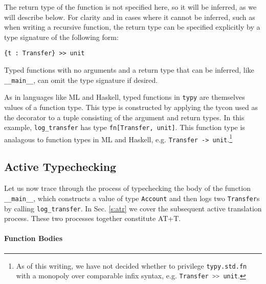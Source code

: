 \documentclass[preprint,10pt]{sigplanconf}
\newcommand{\lip}[1]{\lstinline[language=Python,basicstyle=\ttfamily\small,deletendkeywords={tuple,buffer,map}]{#1}}
\begin{document}
The return type of the function is not specified here, so it will be inferred, as we will describe below. For clarity and in cases where it cannot be inferred, such as when writing a recursive function, the return type can be specified explicitly by a type signature of the following form:
 \begin{lstlisting}[numbers=none]
 {t : Transfer} >> unit
 \end{lstlisting}
Typed functions with no arguments and a return type that can be inferred, like \lip{__main__}, can omit the type signature if desired.

As in languages like ML and Haskell, typed functions in \verb|typy| are themselves values of a function type. This type is constructed by applying the tycon used as the decorator to a tuple consisting of the argument and return types. In this example, \lip{log_transfer} has type \lip{fn[Transfer, unit]}. This function type is analagous to function types in ML and Haskell, e.g. \lstinline{Transfer -> unit}.\footnote{As of this writing, we have not decided whether to privilege \lip{typy.std.fn} with a monopoly over comparable infix syntax, e.g. \lip{Transfer >> unit}.}

\subsection{Active Typechecking}\label{s:atc}
Let us now trace through the process of typechecking the body of the function \lip{__main__}, which constructs a value of type \lip{Account} and then logs two \lip{Transfer}s by calling \lip{log_transfer}. In Sec. \ref{s:atr} we cover the subsequent active translation process. These two processes together constitute AT+T.

\paragraph{Function Bodies}
\end{document}
